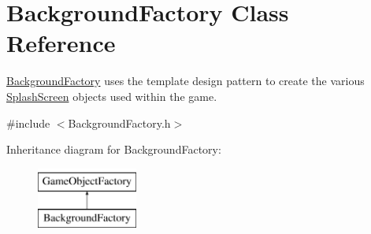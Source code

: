 \hypertarget{class_background_factory}{}\section{Background\+Factory Class Reference}
\label{class_background_factory}


\hyperlink{class_background_factory}{Background\+Factory} uses the template design pattern to create the various \hyperlink{class_splash_screen}{Splash\+Screen} objects used within the game.  




{\ttfamily \#include $<$Background\+Factory.\+h$>$}

Inheritance diagram for Background\+Factory\+:\begin{figure}[H]
\begin{center}
\leavevmode
\includegraphics[height=2.000000cm]{d1/d41/class_background_factory}
\end{center}
\end{figure}
